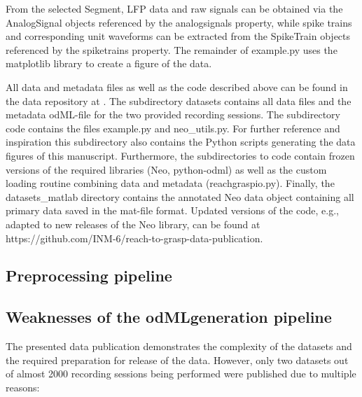 {From the selected Segment, LFP data and raw signals can be obtained via the AnalogSignal objects referenced by the analogsignals property, while spike trains and corresponding unit waveforms can be extracted from the SpikeTrain objects referenced by the spiketrains property. The remainder of example.py uses the matplotlib library to create a figure of the data.

All data and metadata files as well as the code described above can be found in the data repository at . The subdirectory datasets contains all data files and the metadata odML-file for the two provided recording sessions. The subdirectory code contains the files example.py and neo\_utils.py. For further reference and inspiration this subdirectory also contains the Python scripts generating the data figures of this manuscript. Furthermore, the subdirectories to code contain frozen versions of the required libraries (Neo, python-odml) as well as the custom loading routine combining data and metadata (reachgraspio.py). Finally, the datasets\_matlab directory contains the annotated Neo data object containing all primary data saved in the mat-file format. Updated versions of the code, e.g., adapted to new releases of the Neo library, can be found at https://github.com/INM-6/reach-to-grasp-data-publication.
}

\subsection{Preprocessing pipeline}




\subsection{Weaknesses of the odMLgeneration pipeline}
\label{sec:scidata_weaknesses}
The presented data publication demonstrates the complexity of the datasets and the required preparation for release of the data. However, only two datasets out of almost 2000 recording sessions being performed were published due to multiple reasons:

